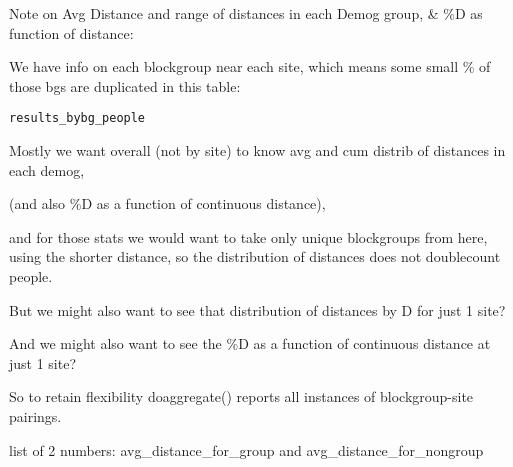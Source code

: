 \documentclass[a4paper]{book}
\begin{document}
%
\begin{Details}\relax
Note on Avg Distance and range of distances in each Demog group, \& \%D as function of distance:

We have info on each blockgroup near each site, which means some small \% of those bgs are duplicated in this table:

\begin{alltt}results_bybg_people
\end{alltt}


Mostly we want overall (not by site) to know avg and cum distrib of distances in each demog,

(and also \%D as a function of continuous distance),

and for those stats we would want to take only unique blockgroups from here,
using the shorter distance, so the distribution of distances does not doublecount people.

But we might also want to see that distribution of distances by D for just 1 site?

And we might also want to see the \%D as a function of continuous distance at just 1 site?

So to retain flexibility doaggregate() reports all instances of blockgroup-site pairings.
\end{Details}
%
\begin{Value}
list of 2 numbers: avg\_distance\_for\_group and avg\_distance\_for\_nongroup
\end{Value}
%
\begin{SeeAlso}\relax
{}  
\end{SeeAlso}
%
\begin{Examples}
\end{Examples}
\end{document}
